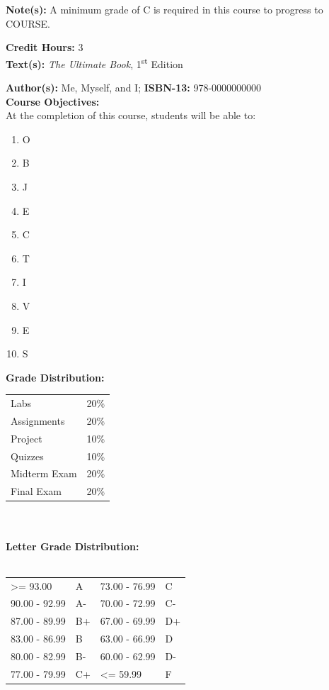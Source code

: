 \documentclass[11pt]{article}
\begin{document}
\textbf {Note(s):} A minimum grade of C is required in this course to progress to COURSE. 

\textbf {Credit Hours:} 3 \\

\textbf {\large Text(s):} \emph{The Ultimate Book}, 1\textsuperscript{st} Edition

\textbf {Author(s):} Me, Myself, and I;  \textbf {ISBN-13:} 978-0000000000 \\

\textbf {\large Course Objectives:} \\
At the completion of this course, students will be able to:
\begin{enumerate} \itemsep-0.4em
  \item O
  \item B
  \item J  \item E
  \item C  \item T  \item I
  \item V
  \item E
  \item S
\end{enumerate}

\textbf {\large Grade Distribution:} \\
\hspace*{40mm}
\begin{tabular}{ l l }
Labs & 20\% \\
Assignments & 20\% \\
Project & 10\% \\
Quizzes  & 10\% \\
Midterm Exam  & 20\% \\
Final Exam  & 20\%
\end{tabular} \\\\

\textbf {\large Letter Grade Distribution:} \\\\
\hspace*{40mm}
\begin{tabular}{ l l | l l }
\textgreater= 93.00 & A & 73.00 - 76.99 & C \\
90.00 - 92.99 & A-  & 70.00 - 72.99 & C- \\
87.00 - 89.99 & B+  & 67.00 - 69.99 & D+ \\
83.00 - 86.99 & B  & 63.00 - 66.99 & D \\
80.00 - 82.99 & B-  & 60.00 - 62.99 & D- \\
77.00 - 79.99 & C+  & \textless= 59.99 & F \\
\end{tabular} \\
\end{document}
